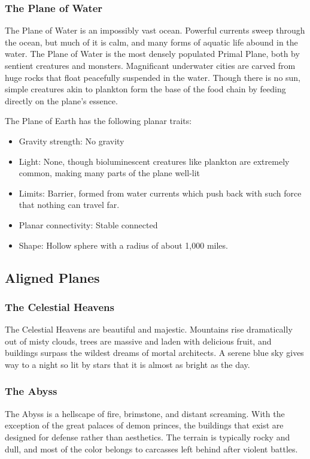         \subsubsection{The Plane of Water}
        The Plane of Water is an impossibly vast ocean.
        Powerful currents sweep through the ocean, but much of it is calm, and many forms of aquatic life abound in the water.
        The Plane of Water is the most densely populated Primal Plane, both by sentient creatures and monsters.
        Magnificant underwater cities are carved from huge rocks that float peacefully suspended in the water.
        Though there is no sun, simple creatures akin to plankton form the base of the food chain by feeding directly on the plane's essence.

        The Plane of Earth has the following planar traits:
        \begin{itemize}
            \item Gravity strength: No gravity
            \item Light: None, though bioluminescent creatures like plankton are extremely common, making many parts of the plane well-lit
            \item Limits: Barrier, formed from water currents which push back with such force that nothing can travel far.
            \item Planar connectivity: Stable connected
            \item Shape: Hollow sphere with a radius of about 1,000 miles.
        \end{itemize}

        \subsection{Aligned Planes}\label{Aligned Planes}

            \subsubsection{The Celestial Heavens}
                The Celestial Heavens are beautiful and majestic.
                Mountains rise dramatically out of misty clouds, trees are massive and laden with delicious fruit, and buildings surpass the wildest dreams of mortal architects.
                A serene blue sky gives way to a night so lit by stars that it is almost as bright as the day.

            \subsubsection{The Abyss}
                The Abyss is a hellscape of fire, brimstone, and distant screaming.
                With the exception of the great palaces of demon princes, the buildings that exist are designed for defense rather than aesthetics.
                The terrain is typically rocky and dull, and most of the color belongs to carcasses left behind after violent battles.

